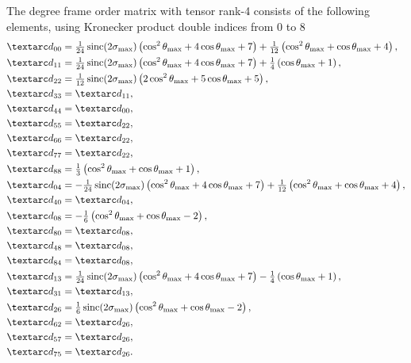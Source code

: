 The  degree frame order matrix with tensor rank-4 consists of the following elements, using Kronecker product double indices from 0 to 8
\begin{subequations} \label{eq: iso cone 2nd degree frame order matrix}
\begin{align}
    &\FO_{00} = \tfrac{1}{24} \sinc(2\conesmax) \left( \cos^2\conethetamax + 4\cos\conethetamax + 7 \right)  +  \tfrac{1}{12} \left( \cos^2\conethetamax + \cos\conethetamax + 4 \right) , \\
    &\FO_{11} = \tfrac{1}{24} \sinc(2\conesmax) \left( \cos^2\conethetamax + 4\cos\conethetamax + 7 \right)  + \quart \left( \cos\conethetamax + 1 \right), \\
    &\FO_{22} = \tfrac{1}{12} \sinc(2\conesmax) \left( 2\cos^2\conethetamax + 5\cos\conethetamax + 5 \right) , \\
    &\FO_{33} = \FO_{11} , \\
    &\FO_{44} = \FO_{00} , \\
    &\FO_{55} = \FO_{22} , \\
    &\FO_{66} = \FO_{22} , \\
    &\FO_{77} = \FO_{22} , \\
    &\FO_{88} = \tfrac{1}{3} \left( \cos^2\conethetamax + \cos\conethetamax + 1 \right) , \\
    &\FO_{04} = -\tfrac{1}{24} \sinc(2\conesmax) \left( \cos^2\conethetamax + 4\cos\conethetamax + 7 \right)  +  \tfrac{1}{12} \left( \cos^2\conethetamax + \cos\conethetamax + 4 \right) , \\
    &\FO_{40} = \FO_{04} , \\
    &\FO_{08} = -\tfrac{1}{6} \left( \cos^2\conethetamax + \cos\conethetamax - 2 \right) , \\
    &\FO_{80} = \FO_{08} , \\
    &\FO_{48} = \FO_{08} , \\
    &\FO_{84} = \FO_{08} , \\
    &\FO_{13} = \tfrac{1}{24} \sinc(2\conesmax) \left( \cos^2\conethetamax + 4\cos\conethetamax + 7 \right)  -  \quart \left( \cos\conethetamax + 1 \right) , \\
    &\FO_{31} = \FO_{13} , \\
    &\FO_{26} = \tfrac{1}{6} \sinc(2\conesmax) \left( \cos^2\conethetamax + \cos\conethetamax - 2 \right) , \\
    &\FO_{62} = \FO_{26} , \\
    &\FO_{57} = \FO_{26} , \\
    &\FO_{75} = \FO_{26} .
\end{align}
\end{subequations}


